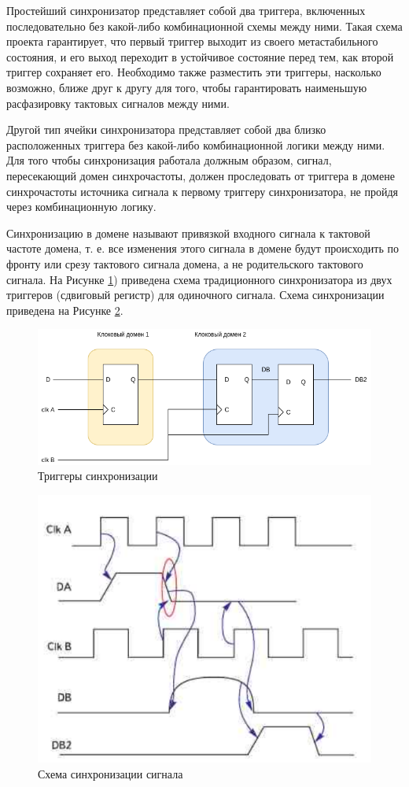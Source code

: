 Простейший синхронизатор представляет собой два триггера, включенных последовательно без какой-либо комбинационной схемы между ними. Такая схема проекта гарантирует, что первый триггер выходит из своего метастабильного состояния, и его выход переходит в устойчивое состояние перед тем, как второй триггер сохраняет его. Необходимо также разместить эти триггеры, насколько возможно, ближе друг к другу для того, чтобы гарантировать наименьшую расфазировку тактовых сигналов между ними. 

Другой тип ячейки синхронизатора представляет собой два близко расположенных триггера без какой-либо комбинационной логики между ними. Для того чтобы синхронизация работала должным образом, сигнал, пересекающий домен синхрочастоты, должен проследовать от триггера в домене синхрочастоты источника сигнала к первому триггеру синхронизатора, не пройдя через комбинационную логику.

Синхронизацию в домене называют привязкой входного сигнала к тактовой частоте
домена, т. е. все изменения этого сигнала в домене будут происходить по фронту или срезу
тактового сигнала домена, а не родительского тактового сигнала. На Рисунке \ref{fig:sync-triggers}) приведена схема традиционного синхронизатора из
двух триггеров (сдвиговый регистр) для одиночного сигнала. Схема синхронизации приведена на Рисунке \ref {fig:sync-scheme}.

\begin{figure}[h!]
	\centering
	\includegraphics[width=0.7\linewidth]{course-scheme/images/sync-triggers}
	\caption{Триггеры синхронизации}
	\label{fig:sync-triggers}
\end{figure}

\begin{figure}[h!]
	\centering
	\includegraphics[width=0.5\linewidth]{course-scheme/images/sync-scheme}
	\caption{Схема синхронизации сигнала}
	\label{fig:sync-scheme}
\end{figure}


